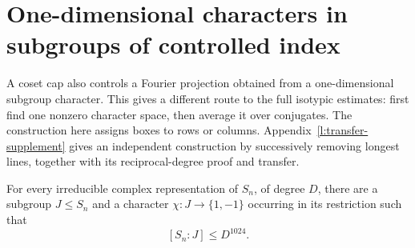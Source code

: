 \section{One-dimensional characters in subgroups of controlled index}
\label{l:characters-section}

A coset cap also controls a Fourier projection obtained from a
one-dimensional subgroup character.  This gives a different route to
the full isotypic estimates: first find one nonzero character space,
then average it over conjugates. The construction here assigns boxes
to rows or columns. Appendix~\ref{l:transfer-supplement} gives an
independent construction by successively removing longest lines,
together with its reciprocal-degree proof and transfer.

\begin{lemma}
\label{l:small-index-character}
For every irreducible complex representation of $S_n$, of degree $D$,
there are a subgroup $J\le S_n$ and a character
$\chi:J\to\{1,-1\}$ occurring in its restriction such that
\[
 [S_n:J]\le D^{1024}.
\]
\end{lemma}
